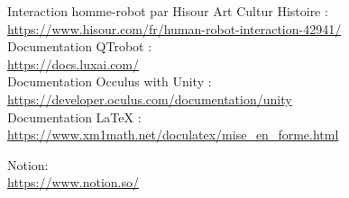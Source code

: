 Interaction homme-robot par Hisour Art Cultur Histoire : \\
\url{https://www.hisour.com/fr/human-robot-interaction-42941/} \\

Documentation QTrobot :\\
\url{https://docs.luxai.com/}\\

Documentation Occulus with Unity :\\
\url{https://developer.oculus.com/documentation/unity}\\

Documentation LaTeX :\\
\url{https://www.xm1math.net/doculatex/mise_en_forme.html}

Notion: \\
\url{https://www.notion.so/}